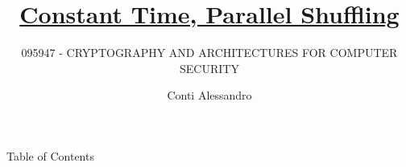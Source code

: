 \documentclass[aspectratio=169]{beamer}
\title{\href{https://github.com/AlessandroConti11/Constant_Time-Parallel_Shuffling}{Constant Time, Parallel Shuffling}}
\subtitle{\small 095947 - CRYPTOGRAPHY AND ARCHITECTURES FOR COMPUTER SECURITY}
\author{Conti Alessandro}
\date{}
\begin{document}
    \begin{frame}
        \maketitle
    \end{frame}
    
    \begin{frame}{Table of Contents}
        \begin{columns}
            \begin{column}{0.5\textwidth}
                \tableofcontents[sections={1-2}]
            \end{column}
            \begin{column}{0.5\textwidth}
                \tableofcontents[sections={3}]
            \end{column}
        \end{columns}
    \end{frame}

    
    
    
    
\end{document}
